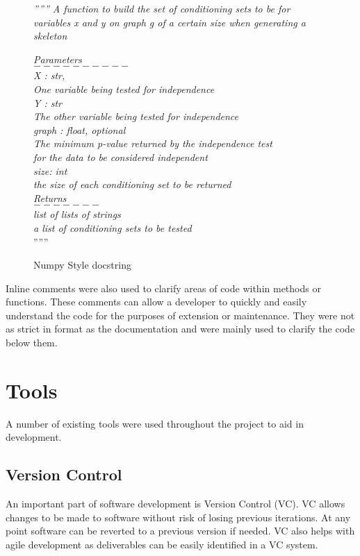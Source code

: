 \documentclass{UoYCSproject}
\begin{document}
\begin{figure}
\textit{ '''''' A  function to build the set of conditioning sets to be for variables x and y
	on graph g of a certain size when generating a skeleton}

\textit{Parameters\\
	$ 	---------- $\\
	X : str, \\
	One variable being tested for independence\\ 
	Y : str\\
	The other variable being tested for independence\\
	graph : float, optional\\
	The minimum p-value returned by the independence test\\
	for the data to be considered independent\\
	size: int\\
	the size of each conditioning set to be returned\\
	Returns\\
	$ ------- $\\
	list of lists of strings\\
	a list of conditioning sets to be tested\\}
''''''\\
\caption{Numpy Style docstring} 
\end{figure}

Inline comments were also used to clarify areas of code within methods or functions. These comments can allow a developer to quickly and easily understand the code for the purposes of extension or maintenance. They were not as strict in format as the documentation and were mainly used to clarify the code below them.

\section{Tools}
A number of existing tools were used throughout the project to aid in development. 

\subsection{Version Control}
An important part of software development is Version Control (VC). VC allows changes to be made to software without risk of losing previous iterations. At any point software can be reverted to a previous version if needed. VC also helps with agile development as deliverables can be easily identified in a VC system.
\end{document}
